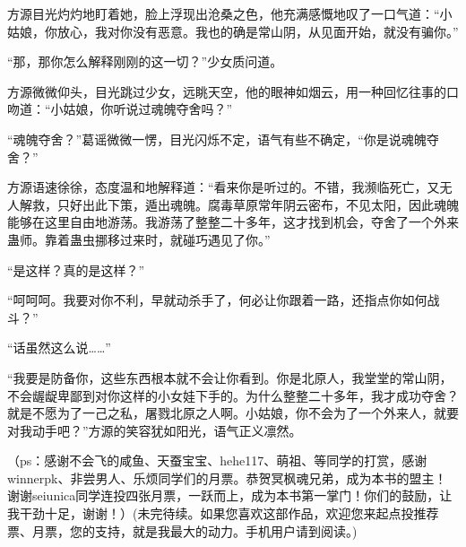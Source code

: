 \begin{this_body}
方源目光灼灼地盯着她，脸上浮现出沧桑之色，他充满感慨地叹了一口气道：“小姑娘，你放心，我对你没有恶意。我也的确是常山阴，从见面开始，就没有骗你。”

“那，那你怎么解释刚刚的这一切？”少女质问道。

方源微微仰头，目光跳过少女，远眺天空，他的眼神如烟云，用一种回忆往事的口吻道：“小姑娘，你听说过魂魄夺舍吗？”

“魂魄夺舍？”葛谣微微一愣，目光闪烁不定，语气有些不确定，“你是说魂魄夺舍？”

方源语速徐徐，态度温和地解释道：“看来你是听过的。不错，我濒临死亡，又无人解救，只好出此下策，遁出魂魄。腐毒草原常年阴云密布，不见太阳，因此魂魄能够在这里自由地游荡。我游荡了整整二十多年，这才找到机会，夺舍了一个外来蛊师。靠着蛊虫挪移过来时，就碰巧遇见了你。”

“是这样？真的是这样？”

“呵呵呵。我要对你不利，早就动杀手了，何必让你跟着一路，还指点你如何战斗？”

“话虽然这么说……”

“我要是防备你，这些东西根本就不会让你看到。你是北原人，我堂堂的常山阴，不会龌龊卑鄙到对你这样的小女娃下手的。为什么整整二十多年，我才成功夺舍？就是不愿为了一己之私，屠戮北原之人啊。小姑娘，你不会为了一个外来人，就要对我动手吧？”方源的笑容犹如阳光，语气正义凛然。

（ps：感谢不会飞的咸鱼、天蚕宝宝、hehe117、萌祖、等同学的打赏，感谢winnerpk、非尝男人、乐烦同学们的月票。恭贺冥枫魂兄弟，成为本书的盟主！谢谢seiunica同学连投四张月票，一跃而上，成为本书第一掌门！你们的鼓励，让我干劲十足，谢谢！）(未完待续。如果您喜欢这部作品，欢迎您来起点投推荐票、月票，您的支持，就是我最大的动力。手机用户请到阅读。)

\end{this_body}

